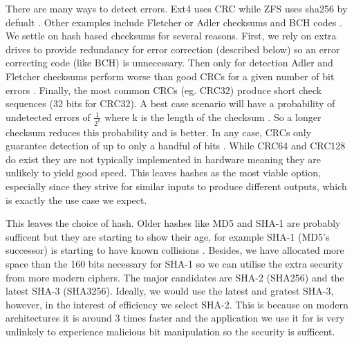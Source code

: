 
        There are many ways to detect errors. Ext4 uses CRC \cite{ext4_docs}
        while ZFS uses sha256 by defualt \cite{ZFS_docs}. Other examples
        include Fletcher or Adler checksums \cite{embedded_checksums} and BCH
        codes \cite{flash_error_manual}. We settle on hash based checksums for
        several reasons. First, we rely on extra drives to provide redundancy
        for error correction (described below) so an error correcting code
        (like BCH) is unnecessary. Then only for detection Adler and Fletcher
        checksums perform worse than good CRCs for a given number of bit errors
        \citeauthor{embedded_checksums}. Finally, the most common CRCs (eg.
        CRC32) produce short check sequences (32 bits for CRC32). A best case
        scenario will have a probability of undetected errors of
        $\frac{1}{2^k}$ where k is the length of the checksum
        \cite{embedded_checksums}. So a longer checksum reduces this
        probability and is better. In any case, CRCs only guarantee detection
        of up to only a handful of bits \cite{embedded_checksums}. While CRC64
        and CRC128 do exist they are not typically implemented in hardware
        meaning they are unlikely to yield good speed. This leaves hashes as
        the most viable option, especially since they strive for similar inputs
        to produce different outputs, which is exactly the use case we expect.

        This leaves the choice of hash. Older hashes like MD5 and SHA-1
        \cite{sha1} are probably sufficent but they are starting to show their
        age, for example SHA-1 (MD5's successor) is starting to have known
        collisions \cite{SHA_collision}. Besides, we have allocated more space
        than the 160 bits necessary for SHA-1 so we can utilise the extra
        security from more modern ciphers. The major candidates are SHA-2
        \cite{sha2_analysis} (SHA256) and the latest SHA-3 \cite{sha3}
        (SHA3256). Ideally, we would use the latest and gratest SHA-3, however,
        in the interest of efficiency we select SHA-2.  This is because on
        modern architectures it is around 3 times faster \cite{hash_stats} and
        the application we use it for is very unlinkely to experience malicious
        bit manipulation so the security is sufficent.

